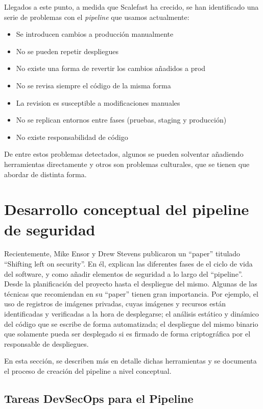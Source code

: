 \documentclass[12pt]{report} %
\begin{document}
Llegados a este punto, a medida que Scalefast ha crecido, se han identificado una serie de problemas con el
\textit{\gls{pipeline}} que usamos actualmente: 

\begin{itemize} \item{Se introducen cambios a producción manualmente} \item{No
    se pueden repetir despliegues} \item{No existe una forma de revertir los
    cambios añadidos a prod} \item{No se revisa siempre el código de la misma
    forma} \item{La revision es susceptible a modificaciones manuales} \item{No
se replican entornos entre fases (pruebas, \gls{staging} y producción)} \item{No
existe responsabilidad de código} \end{itemize}

De entre estos problemas detectados, algunos se pueden solventar añadiendo
herramientas directamente y otros son problemas culturales, que se tienen que
abordar de distinta forma.


\section{Desarrollo conceptual del pipeline de seguridad}

Recientemente, Mike Ensor y Drew Stevens publicaron un ``paper'' titulado
``Shifting left on security''.  En él, explican las diferentes fases de el ciclo
de vida del software, y como añadir elementos de seguridad a lo largo del
``pipeline''.  Desde la planificación del proyecto hasta el despliegue del
mismo.  Algunas de las técnicas que recomiendan en su ``paper'' tienen gran
importancia. Por ejemplo,  el uso de registros de imágenes privadas, cuyas
imágenes y recursos están identificadas y verificadas a la hora de desplegarse;
el análisis estático y dinámico del código que se escribe de forma automatizada;
el despliegue del mismo binario que solamente pueda ser desplegado si es firmado
de forma criptográfica por el responsable de despliegues.\cite{Ensor2021}

En esta sección, se describen más en detalle dichas herramientas y se documenta
el proceso de creación del pipeline a nivel conceptual.

\subsection{Tareas DevSecOps para el Pipeline}
\end{document}
